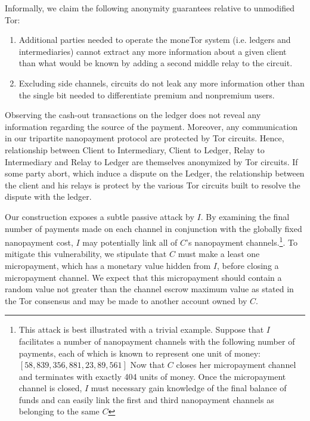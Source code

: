 Informally, we claim the following anonymity guarantees relative to unmodified Tor:

\begin{enumerate}
\item Additional parties needed to operate the moneTor system (i.e. ledgers and
  intermediaries) cannot extract any more information about a given client than
  what would be known by adding a second middle relay to the circuit.
\item Excluding side channels, circuits do not leak any more information other than the single bit needed to differentiate premium and nonpremium users.
\end{enumerate}

Observing the cash-out transactions on the ledger does not reveal any information regarding the source of the payment. Moreover, any communication in our tripartite nanopayment protocol are protected by Tor circuits. Hence, relationship between Client to Intermediary, Client to Ledger, Relay to Intermediary and Relay to Ledger are themselves anonymized by Tor circuits. If some party abort, which induce a dispute on the Ledger, the relationship between the client and his relays is protect by the various Tor circuits built to resolve the dispute with the ledger.

Our construction exposes a subtle passive attack by $I$. By examining
the final number of payments made on each channel in conjunction with the
globally fixed nanopayment cost, $I$ may potentially link all of $C$'s
nanopayment channels.\footnote{This attack is best illustrated with a trivial
  example. Suppose that $I$ facilitates a number of nanopayment channels with
  the following number of payments, each of which is known to represent one unit
  of money: $[58, 839, 356, 881, 23, 89, 561]$ Now that $C$ closes her
  micropayment channel and terminates with exactly 404 units of money. Once the
  micropayment channel is closed, $I$ must necessary gain knowledge of the final
  balance of funds and can easily link the first and third nanopayment channels
  as belonging to the same $C$}. To mitigate this vulnerability, we stipulate
that $C$ must make a least one micropayment, which has a monetary value hidden
from $I$, before closing a micropayment channel. We expect that this micropayment should
contain a random value not greater than the channel escrow maximum value as stated in the Tor consensus and may be made to another account owned by $C$.


